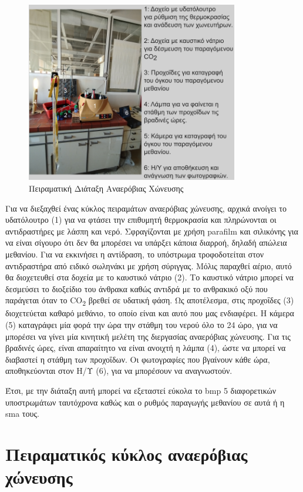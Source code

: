 \documentclass[11pt]{report}
\begin{document}
\begin{figure}[htbp]
\centering
\includegraphics[width=350px]{./anaerobic_digestion_captioned.png}
\caption{\label{fig:org90632ee}Πειραματική Διάταξη Αναερόβιας Χώνευσης}
\end{figure}

Για να διεξαχθεί ένας κύκλος πειραμάτων αναερόβιας χώνευσης, αρχικά ανοίγει το υδατόλουτρο (1) για να φτάσει την επιθυμητή θερμοκρασία και πληρώνονται οι αντιδραστήρες με λάσπη και νερό. Σφραγίζονται με χρήση parafilm και σιλικόνης για να είναι σίγουρο ότι δεν θα μπορέσει να υπάρξει κάποια διαρροή, δηλαδή απώλεια μεθανίου. Για να εκκινήσει η αντίδραση, το υπόστρωμα τροφοδοτείται στον αντιδραστήρα από ειδικό σωληνάκι με χρήση σύριγγας. Μόλις παραχθεί αέριο, αυτό θα διοχετευθεί στα δοχεία με το καυστικό νάτριο (2). Το καυστικό νάτριο μπορεί να δεσμεύσει το διοξείδιο του άνθρακα καθώς αντιδρά με το ανθρακικό οξύ που παράγεται όταν το CO\textsubscript{2} βρεθεί σε υδατική φάση. Ως αποτέλεσμα, στις προχοΐδες (3) διοχετεύεται καθαρό μεθάνιο, το οποίο είναι και αυτό που μας ενδιαφέρει. Η κάμερα (5) καταγράφει μία φορά την ώρα την στάθμη του νερού όλο το 24 ώρο, για να μπορέσει να γίνει μία κινητική μελέτη της διεργασίας αναερόβιας χώνευσης. Για τις βραδινές ώρες, είναι απαραίτητο να είναι ανοιχτή η λάμπα (4), ώστε να μπορεί να διαβαστεί η στάθμη των προχοΐδων. Οι φωτογραφίες που βγαίνουν κάθε ώρα, αποθηκεύονται στον Η/Υ (6), για να μπορέσουν να αναγνωστούν.

Έτσι, με την διάταξη αυτή μπορεί να εξεταστεί εύκολα το \acrfull{bmp} 5 διαφορετικών υποστρωμάτων ταυτόχρονα καθώς και ο ρυθμός παραγωγής μεθανίου σε αυτά ή η \acrfull{sma} τους. 

\section{Πειραματικός κύκλος αναερόβιας χώνευσης}
\label{sec:orgb03d37c}
\label{sec:exp-ad}
\end{document}
